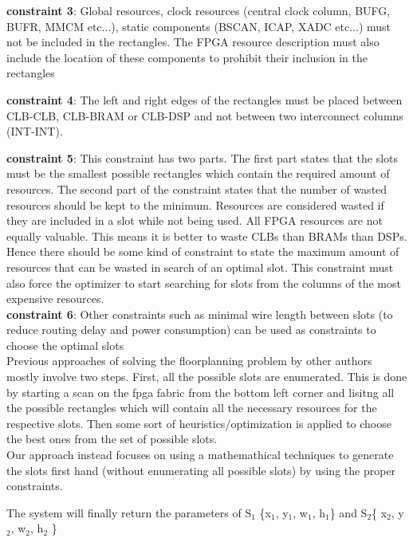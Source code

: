 \documentclass[11pt]{article}
\theoremstyle{definition}
\begin{document}
\textbf{constraint 3}: Global resources, clock resources (central clock column, BUFG, BUFR, MMCM etc...), static components (BSCAN, ICAP, XADC etc...) must not be included in the rectangles. The FPGA resource description must also include the location of these components to prohibit their inclusion in the rectangles

\textbf{constraint 4}: The left and right edges of the rectangles must be placed between CLB-CLB, CLB-BRAM or CLB-DSP and not between two interconnect columns (INT-INT).

\textbf{constraint 5}: This constraint has two parts. The first part states that the slots must be the smallest possible rectangles which contain the required amount of resources. The second part of the constraint states that the number of wasted resources should be kept to the minimum. Resources are considered wasted if they are included in a slot while not being used. All FPGA resources are not equally valuable. This means it is better to waste CLBs than BRAMs than DSPs. Hence there should be some kind of constraint to state the maximum amount of resources that can be wasted in search of an optimal slot. This constraint must also force the optimizer to start searching for slots from the columns of the most expensive resources. \\

\textbf{constraint 6}: Other constraints such as minimal wire length between slots (to reduce routing delay and power consumption) can be used as constraints to choose the optimal slots \\
 
Previous approaches of solving the floorplanning problem by other authors mostly involve two steps. First, all the possible slots are enumerated. This is done by starting a scan on the fpga fabric from the bottom left corner and lisitng all the possible rectangles which will contain all the necessary resources for the respective slots. Then some sort of heuristics/optimization is applied to choose the best ones from the set of possible slots.\\
Our approach instead focuses on using a mathemathical techniques to generate the slots first hand (without enumerating all possible slots) by using the proper constraints. 


The system will finally return the parameters of S$_1$ \{x$_1$, y$_1$, w$_1$, h$_1$\} and S$_2$\{ x$_2$, y$_2$, w$_2$, h$_2$ \} \\
\end{document}
